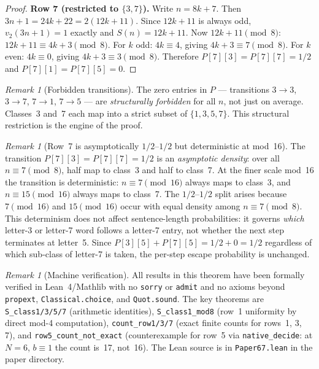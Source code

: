 \documentclass[12pt]{article}
\theoremstyle{definition}
\theoremstyle{remark}
\newtheorem{remark}[theorem]{Remark}
\newcommand{\vt}{v_2}
\newcommand{\Sm}{S}
\begin{document}
\begin{proof}
\medskip\noindent
\textbf{Row 7 (restricted to $\{3, 7\}$).}
Write $n = 8k+7$. Then $3n+1 = 24k+22 = 2(12k+11)$.
Since $12k+11$ is always odd, $\vt(3n+1) = 1$ exactly and $\Sm(n) = 12k+11$.
Now $12k+11 \pmod 8$: $12k+11 \equiv 4k+3 \pmod 8$.
For $k$ odd: $4k \equiv 4$, giving $4k+3 \equiv 7 \pmod 8$.
For $k$ even: $4k \equiv 0$, giving $4k+3 \equiv 3 \pmod 8$.
Therefore $P[7][3] = P[7][7] = 1/2$ and $P[7][1] = P[7][5] = 0$.
\end{proof}

\begin{remark}[Forbidden transitions]
\label{rem:forbidden}
The zero entries in $P$ — transitions $3 \to 3$, $3 \to 7$, $7 \to 1$,
$7 \to 5$ — are \emph{structurally forbidden} for all $n$, not just on
average. Classes~3 and~7 each map into a strict subset of $\{1,3,5,7\}$.
This structural restriction is the engine of the proof.
\end{remark}

\begin{remark}[Row~7 is asymptotically $1/2$--$1/2$ but deterministic at mod~16]
\label{rem:row7-determinism}
The transition $P[7][3] = P[7][7] = 1/2$ is an \emph{asymptotic density}:
over all $n \equiv 7 \pmod 8$, half map to class~3 and half to class~7.
At the finer scale mod~16 the transition is deterministic:
$n \equiv 7 \pmod{16}$ always maps to class~3, and
$n \equiv 15 \pmod{16}$ always maps to class~7.
The $1/2$--$1/2$ split arises because $7 \pmod{16}$ and $15 \pmod{16}$
occur with equal density among $n \equiv 7 \pmod 8$.
This determinism does not affect sentence-length probabilities: it governs
\emph{which} letter-3 or letter-7 word follows a letter-7 entry,
not whether the next step terminates at letter~5.
Since $P[3][5] + P[7][5] = 1/2 + 0 = 1/2$ regardless of which sub-class of
letter-7 is taken, the per-step escape probability is unchanged.
\end{remark}

\begin{remark}[Machine verification]
\label{rem:lean}
All results in this theorem have been formally verified in Lean~4/Mathlib
with no \texttt{sorry} or \texttt{admit} and no axioms beyond
\texttt{propext}, \texttt{Classical.choice}, and \texttt{Quot.sound}.
The key theorems are \texttt{S\_class1/3/5/7} (arithmetic identities),
\texttt{S\_class1\_mod8} (row~1 uniformity by direct mod-4 computation),
\texttt{count\_row1/3/7} (exact finite counts for rows~1, 3, 7), and
\texttt{row5\_count\_not\_exact} (counterexample for row~5 via
\texttt{native\_decide}: at $N=6$, $b \equiv 1$ the count is~17, not~16).
The Lean source is in \texttt{Paper67.lean} in the paper directory.
\end{remark}
\end{document}
